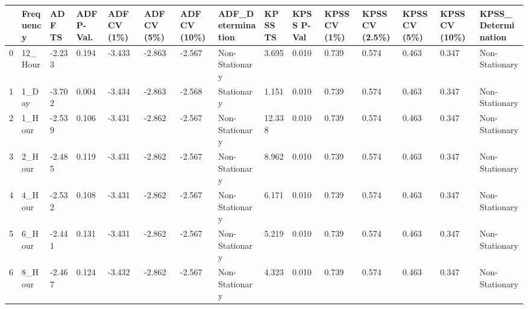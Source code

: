 \begin{tabular}{lllllllllllllll}
\toprule
 & Frequency & ADF TS & ADF P-Val. & ADF CV (1\%) & ADF CV (5\%) & ADF CV (10\%) & ADF_Determination & KPSS TS & KPSS P-Val & KPSS CV (1\%) & KPSS CV (2.5\%) & KPSS CV (5\%) & KPSS CV (10\%) & KPSS_Determination \\
\midrule
0 & 12_Hour & -2.233 & 0.194 & -3.433 & -2.863 & -2.567 & Non-Stationary & 3.695 & 0.010 & 0.739 & 0.574 & 0.463 & 0.347 & Non-Stationary \\
1 & 1_Day & -3.702 & 0.004 & -3.434 & -2.863 & -2.568 & Stationary & 1.151 & 0.010 & 0.739 & 0.574 & 0.463 & 0.347 & Non-Stationary \\
2 & 1_Hour & -2.539 & 0.106 & -3.431 & -2.862 & -2.567 & Non-Stationary & 12.338 & 0.010 & 0.739 & 0.574 & 0.463 & 0.347 & Non-Stationary \\
3 & 2_Hour & -2.485 & 0.119 & -3.431 & -2.862 & -2.567 & Non-Stationary & 8.962 & 0.010 & 0.739 & 0.574 & 0.463 & 0.347 & Non-Stationary \\
4 & 4_Hour & -2.532 & 0.108 & -3.431 & -2.862 & -2.567 & Non-Stationary & 6.171 & 0.010 & 0.739 & 0.574 & 0.463 & 0.347 & Non-Stationary \\
5 & 6_Hour & -2.441 & 0.131 & -3.431 & -2.862 & -2.567 & Non-Stationary & 5.219 & 0.010 & 0.739 & 0.574 & 0.463 & 0.347 & Non-Stationary \\
6 & 8_Hour & -2.467 & 0.124 & -3.432 & -2.862 & -2.567 & Non-Stationary & 4.323 & 0.010 & 0.739 & 0.574 & 0.463 & 0.347 & Non-Stationary \\
\bottomrule
\end{tabular}

